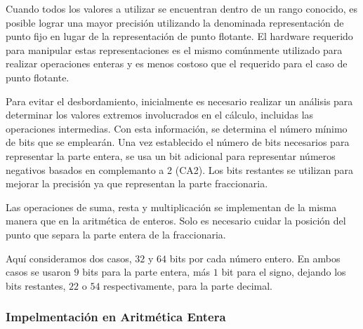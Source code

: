 Cuando todos los valores a utilizar se encuentran dentro de un rango conocido, es posible lograr una mayor precisión utilizando la denominada representación de punto fijo en lugar de la representación de punto flotante.
El hardware requerido para manipular estas representaciones es el mismo comúnmente utilizado para realizar operaciones enteras y es menos costoso que el requerido para el caso de punto flotante.

Para evitar el desbordamiento, inicialmente es necesario realizar un análisis para determinar los valores extremos involucrados en el cálculo, incluidas las operaciones intermedias.
Con esta información, se determina el número mínimo de bits que se emplearán.
Una vez establecido el número de bits necesarios para representar la parte entera, se usa un bit adicional para representar números negativos basados en complemanto a 2 (CA2).
Los bits restantes se utilizan para mejorar la precisión ya que representan la parte fraccionaria.

Las operaciones de suma, resta y multiplicación se implementan de la misma manera que en la aritmética de enteros.
Solo es necesario cuidar la posición del punto que separa la parte entera de la fraccionaria.

Aquí consideramos dos casos, $32$ y $64$ bits por cada número entero.
En ambos casos se usaron $9$ bits para la parte entera, más $1$ bit para el signo, dejando los bits restantes, $22$ o $54$ respectivamente, para la parte decimal.

\subsubsection{Impelmentación en Aritmética Entera}
\label{sec:impleInt}

